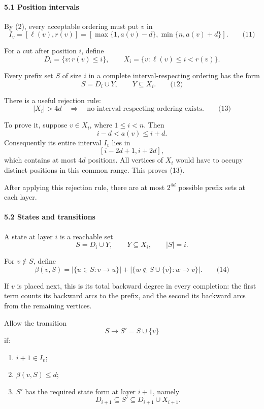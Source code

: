 \documentclass[
  11pt,
  a4paper,
]{article}
\providecommand{\tightlist}{%
  \setlength{\itemsep}{0pt}\setlength{\parskip}{0pt}}
\begin{document}
\paragraph{5.1 Position intervals}\label{position-intervals}

By (2), every acceptable ordering must put \(v\) in \[
I_v=[\ell(v),r(v)]
 =
[\max\{1,a(v)-d\},\min\{n,a(v)+d\}]. \qquad\text{(11)}
\]

For a cut after position \(i\), define \[
D_i=\{v:r(v)\le i\},
\qquad
X_i=\{v:\ell(v)\le i<r(v)\}.
\]

Every prefix set \(S\) of size \(i\) in a complete interval-respecting
ordering has the form \[
S=D_i\cup Y,\qquad Y\subseteq X_i. \qquad\text{(12)}
\]

There is a useful rejection rule: \[
|X_i|>4d \quad\Longrightarrow\quad
\text{no interval-respecting ordering exists}. \qquad\text{(13)}
\]

To prove it, suppose \(v\in X_i\), where \(1\le i<n\). Then \[
i-d<a(v)\le i+d.
\] Consequently its entire interval \(I_v\) lies in \[
[i-2d+1,i+2d],
\] which contains at most \(4d\) positions. All vertices of \(X_i\)
would have to occupy distinct positions in this common range. This
proves (13).

After applying this rejection rule, there are at most \(2^{4d}\)
possible prefix sets at each layer.

\paragraph{5.2 States and transitions}\label{states-and-transitions}

A state at layer \(i\) is a reachable set \[
S=D_i\cup Y,\qquad Y\subseteq X_i,\qquad |S|=i.
\]

For \(v\notin S\), define \[
\beta(v,S)
=
|\{u\in S:v\to u\}|
+
|\{w\notin S\cup\{v\}:w\to v\}|. \qquad\text{(14)}
\]

If \(v\) is placed next, this is its total backward degree in every
completion: the first term counts its backward arcs to the prefix, and
the second its backward arcs from the remaining vertices.

Allow the transition \[
S\longrightarrow S'=S\cup\{v\}
\] if:

\begin{enumerate}
\def\labelenumi{\arabic{enumi}.}
\tightlist
\item
  \(i+1\in I_v\);
\item
  \(\beta(v,S)\le d\);
\item
  \(S'\) has the required state form at layer \(i+1\), namely \[
  D_{i+1}\subseteq S'\subseteq D_{i+1}\cup X_{i+1}.
  \]
\end{enumerate}
\end{document}
